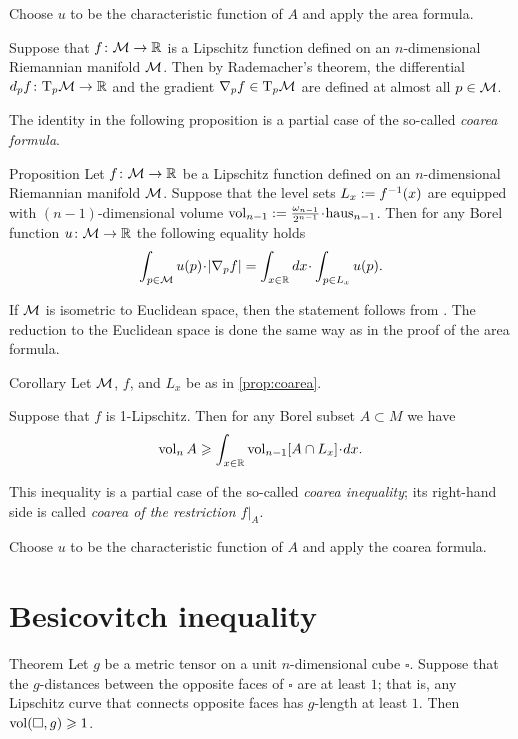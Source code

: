  Choose $u$ to be the characteristic function of $A$ and apply the area formula.
\qeds

Suppose that $f\colon\mathcal{M}\to\mathbb{R}$ is a Lipschitz function defined on an $n$-dimensional Riemannian manifold $\mathcal{M}$.
Then by Rademacher's theorem, the differential $d_pf\colon\mathrm{T}_p\mathcal{M}\to\mathbb{R}$  and the gradient 
$\nabla_pf\in\mathrm{T}_p\mathcal{M}$ are defined at almost all $p\in \mathcal{M}$.

The identity in the following proposition is a partial case of the so-called \emph{coarea formula}.


\begin{thm}{Proposition}\label{prop:coarea}
Let $f\colon\mathcal{M}\to\mathbb{R}$ be a Lipschitz function defined on an $n$-dimensional Riemannian manifold $\mathcal{M}$.
Suppose that the level sets $L_x\mathrel{:=} f^{-1}(x)$ are equipped with $(n-1)$-dimensional volume $\vol_{n-1}\df\tfrac{\omega_{n-1}}{2^{n-1}}\cdot \haus_{n-1}$.
Then for any Borel function $u\colon\mathcal{M}\to \mathbb{R}$ the following equality holds
\[\int_{p\in \spc{M}} u(p)\cdot |\nabla_pf|=\int_{x\in \RR}dx\cdot \int_{p\in L_x} u(p).\]
\end{thm}

If $\mathcal{M}$ is isometric to Euclidean space, then the statement follows from \cite[3.2.12]{federer}.
The reduction to the Euclidean space is done the same way as in the proof of the area formula.
\qeds

\begin{thm}{Corollary}\label{cor:coarea}
Let $\mathcal{M}$, $f$, and $L_x$ be as in \ref{prop:coarea}.

Suppose that $f$ is 1-Lipschitz.
Then for any Borel subset $A\subset M$ we have
\[\vol_n A\ge \int_{x\in\RR} \vol_{n-1}[A\cap L_x]\cdot dx.\]
\end{thm}

This inequality is a partial case of the so-called  \emph{coarea inequality};
its right-hand side is called \emph{coarea of the restriction $f|_A$}. 

 Choose $u$ to be the characteristic function of $A$ and apply the coarea formula.
\qeds


\section{Besicovitch inequality}

\begin{thm}{Theorem}\label{thm:besikovitch}
Let $g$ be a metric tensor on a unit $n$-dimensional cube $\square$.
Suppose that the $g$-distances between the opposite faces of $\square$ are at least $1$; that is, any Lipschitz curve that connects opposite faces has $g$-length at least $1$.
Then $\operatorname{\rm vol}\nolimits(\square, g)\geqslant 1$.
\end{thm}

